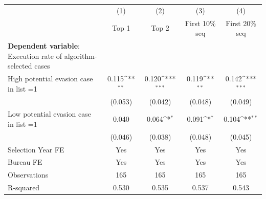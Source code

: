 {
\def\sym#1{\ifmmode^{#1}\else\(^{#1}\)\fi}
\begin{tabular}{l*{4}{c}}
\toprule
            &\multicolumn{1}{c}{(1)}&\multicolumn{1}{c}{(2)}&\multicolumn{1}{c}{(3)}&\multicolumn{1}{c}{(4)}\\
            &\multicolumn{1}{c}{Top 1}&\multicolumn{1}{c}{Top 2}&\multicolumn{1}{c}{First 10\% seq}&\multicolumn{1}{c}{First 20\% seq}\\
\midrule
\textbf{Dependent variable}: Execution rate of algorithm-selected cases&                     &                     &                     &                     \\
\addlinespace
High potential evasion case in list =1&       0.115\sym{**} &       0.120\sym{***}&       0.119\sym{**} &       0.142\sym{***}\\
            &     (0.053)         &     (0.042)         &     (0.048)         &     (0.049)         \\
\addlinespace
Low potential evasion case in list =1&       0.040         &       0.064\sym{*}  &       0.091\sym{*}  &       0.104\sym{**} \\
            &     (0.046)         &     (0.038)         &     (0.048)         &     (0.045)         \\
\midrule
Selection Year FE&         Yes         &         Yes         &         Yes         &         Yes         \\
Bureau FE   &         Yes         &         Yes         &         Yes         &         Yes         \\
Observations&         165         &         165         &         165         &         165         \\
R-squared   &       0.530         &       0.535         &       0.537         &       0.543         \\
\bottomrule
\end{tabular}
}
